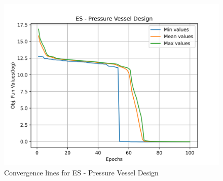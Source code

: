 \begin{figure}[H]
        \centering
        \caption{Convergence lines for ES - Pressure Vessel Design}
        \label{fig:pressure_vessel_problem_solve_es}
        \includegraphics[scale=0.5]{images/pressure_vessel_problem_solve_es.png}
        \end{figure}
        